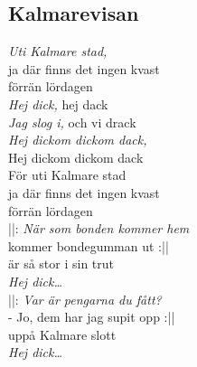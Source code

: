 \subsection*{Kalmarevisan} 

\noindent \textit{Uti Kalmare stad,} \\
\noindent ja där finns det ingen kvast \\
\noindent förrän lördagen \\

\noindent \textit{Hej dick,} hej dack\\
\noindent \textit{Jag slog i,} och vi drack\\
\noindent \textit{Hej dickom dickom dack,}\\
\noindent Hej dickom dickom dack\\
\noindent För uti Kalmare stad\\
\noindent ja där finns det ingen kvast\\
\noindent förrän lördagen\\

\noindent ||: \textit{När som bonden kommer hem}\\
\noindent kommer bondegumman ut :||\\
\noindent är så stor i sin trut\\
\noindent \textit{Hej dick…}\\

\noindent ||: \textit{Var är pengarna du fått?}\\
\noindent - Jo, dem har jag supit opp :||\\
\noindent uppå Kalmare slott\\
\noindent \textit{Hej dick…}\\


\newpage
\noBackground

